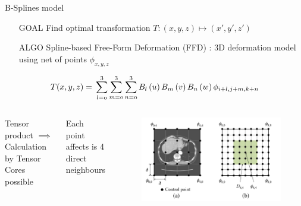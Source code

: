 \begin{frame}{B-Splines model}
	\begin{center}
			\begin{minipage}{0.95\textwidth}
			\centering
			\begin{itemize}	
				\item[GOAL] Find optimal transformation $T: (x,y,z) \longmapsto (x', y', z')$
				\item[ALGO]	Spline-based Free-Form Deformation (FFD) : 3D deformation model	using net of points $\phi_{x,y,z}$
			\end{itemize}
		\end{minipage}
		\begin{equation}
	\mathnormal{
		T(x,y,z) = \newline
		\sum _{l=0}^{3}\sum _{m=0}^{3}\sum _{n=0}^{3}{B}_{l}\left(u\right){B}_{m}\left(v\right){B}_{n}\left(w\right){\phi }_{i+l,j+m,k+n}
	}
	\end{equation}
	
	\begin{columns}
			Tensor product $\implies$ Calculation by Tensor Cores possible
			
			Each point affects is 4 direct neighbours
		\begin{figure}
			\includegraphics[width=\textwidth]{control_net}
		\end{figure}
	\end{columns}
	
	

	
	\end{center}


	
\end{frame}